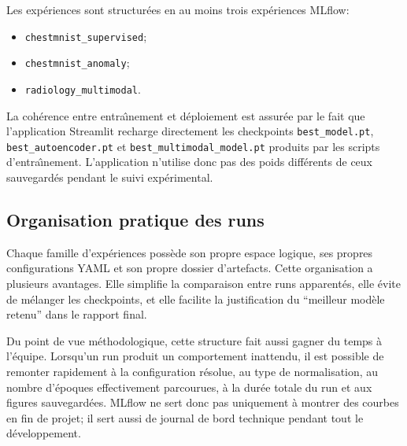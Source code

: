 \documentclass[11pt,a4paper]{article}
\begin{document}
Les exp\'eriences sont structur\'ees en au moins trois exp\'eriences MLflow:
\begin{itemize}
    \item \texttt{chestmnist\_supervised};
    \item \texttt{chestmnist\_anomaly};
    \item \texttt{radiology\_multimodal}.
\end{itemize}

La coh\'erence entre entra\^\i nement et d\'eploiement est assur\'ee par le fait que l'application Streamlit recharge directement les checkpoints \texttt{best\_model.pt}, \texttt{best\_autoencoder.pt} et \texttt{best\_multimodal\_model.pt} produits par les scripts d'entra\^\i nement. L'application n'utilise donc pas des poids diff\'erents de ceux sauvegard\'es pendant le suivi exp\'erimental.

\subsection{Organisation pratique des runs}
Chaque famille d'exp\'eriences poss\`ede son propre espace logique, ses propres configurations YAML et son propre dossier d'artefacts. Cette organisation a plusieurs avantages. Elle simplifie la comparaison entre runs apparent\'es, elle \'evite de m\'elanger les checkpoints, et elle facilite la justification du ``meilleur mod\`ele retenu'' dans le rapport final.

Du point de vue m\'ethodologique, cette structure fait aussi gagner du temps \`a l'\'equipe. Lorsqu'un run produit un comportement inattendu, il est possible de remonter rapidement \`a la configuration r\'esolue, au type de normalisation, au nombre d'\'epoques effectivement parcourues, \`a la dur\'ee totale du run et aux figures sauvegard\'ees. MLflow ne sert donc pas uniquement \`a montrer des courbes en fin de projet; il sert aussi de journal de bord technique pendant tout le d\'eveloppement.
\end{document}
